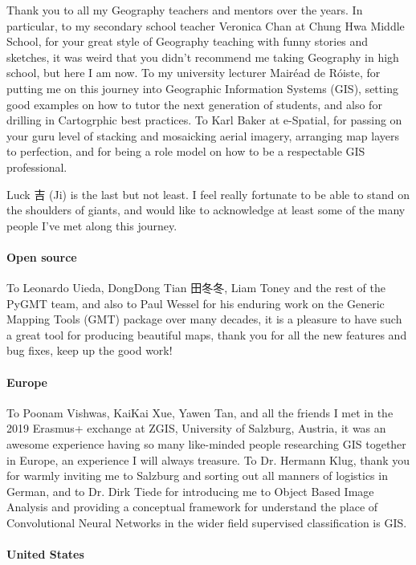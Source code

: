 \documentclass[12pt,twoside]{book}
\begin{document}
\begin{CJK*}{UTF8}{gbsn}
Thank you to all my Geography teachers and mentors over the years.
In particular, to my secondary school teacher Veronica Chan at Chung Hwa Middle School, for your great style of Geography teaching with funny stories and sketches, it was weird that you didn't recommend me taking Geography in high school, but here I am now.
To my university lecturer Mairéad de Róiste, for putting me on this journey into Geographic Information Systems (GIS), setting good examples on how to tutor the next generation of students, and also for drilling in Cartogrphic best practices.
To Karl Baker at e-Spatial, for passing on your guru level of stacking and mosaicking aerial imagery, arranging map layers to perfection, and for being a role model on how to be a respectable GIS professional.

Luck 吉 (Ji) is the last but not least.
I feel really fortunate to be able to stand on the shoulders of giants, and would like to acknowledge at least some of the many people I've met along this journey.

\paragraph{Open source}

To Leonardo Uieda, DongDong Tian 田冬冬, Liam Toney and the rest of the PyGMT team, and also to Paul Wessel for his enduring work on the Generic Mapping Tools (GMT) package over many decades, it is a pleasure to have such a great tool for producing beautiful maps, thank you for all the new features and bug fixes, keep up the good work!

\paragraph{Europe}

To Poonam Vishwas, KaiKai Xue, Yawen Tan, and all the friends I met in the 2019 Erasmus+ exchange at ZGIS, University of Salzburg, Austria, it was an awesome experience having so many like-minded people researching GIS together in Europe, an experience I will always treasure.
To Dr. Hermann Klug, thank you for warmly inviting me to Salzburg and sorting out all manners of logistics in German, and to Dr. Dirk Tiede for introducing me to Object Based Image Analysis and providing a conceptual framework for understand the place of Convolutional Neural Networks in the wider field supervised classification is GIS.

\paragraph{United States}


\end{CJK*}
\end{document}
